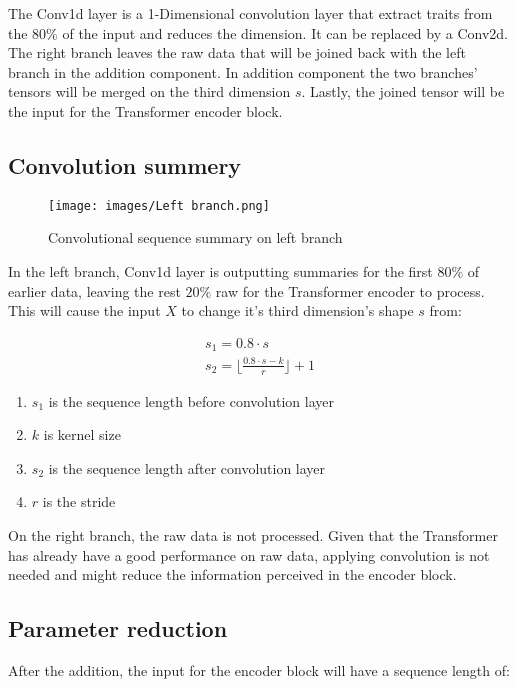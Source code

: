 \documentclass[10pt,journal,compsoc]{IEEEtran}
\begin{document}
The Conv1d layer is a 1-Dimensional convolution layer that extract traits from the $80\%$ of the input and reduces the dimension. It can be replaced by a Conv2d. The right branch leaves the raw data that will be joined back with the left branch in the addition component. In addition component the two branches' tensors will be merged on the third dimension $s$. Lastly, the joined tensor will be the input for the Transformer encoder block. 

\subsection{Convolution summery}

\begin{figure}[h]
    \centering
    \texttt{[image: images/Left branch.png]}
    \caption{Convolutional sequence summary on left branch}
    \label{fig:convolutional-operation}
\end{figure}

In the left branch, Conv1d layer is outputting summaries for the first $80\%$ of earlier data, leaving the rest $20\%$ raw for the Transformer encoder to process. This will cause the input $X$ to change it's third dimension's shape $s$ from:

\begin{gather}
    s_1=0.8\cdot s\\
    s_2=\lfloor\frac{0.8\cdot s-k}{r} \rfloor+1
\end{gather}

\begin{enumerate}
    \item $s_1$ is the sequence length before convolution layer
    \item $k$ is kernel size
    \item $s_2$ is the sequence length after convolution layer
    \item $r$ is the stride
\end{enumerate}

On the right branch, the raw data is not processed. Given that the Transformer has already have a good performance on raw data, applying convolution is not needed and might reduce the information perceived in the encoder block. 

\subsection{Parameter reduction}

After the addition, the input for the encoder block will have a sequence length of:
\end{document}
